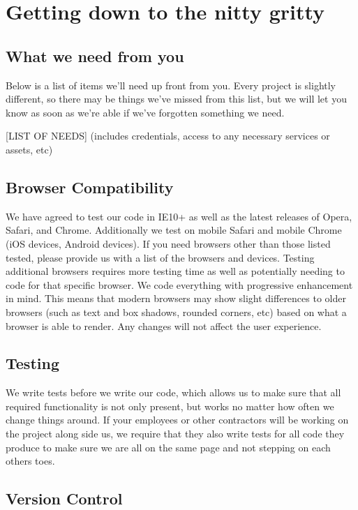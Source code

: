 \documentclass[10pt,a4paper,parskip]{scrartcl}
\begin{document}
\section{Getting down to the nitty gritty}

\subsection{What we need from you}

Below is a list of items we’ll need up front from you. Every project is
slightly different, so there may be things we’ve missed from this list, but we
will let you know as soon as we’re able if we’ve forgotten something we need.

[LIST OF NEEDS] (includes credentials, access to any necessary services or
assets, etc)

\subsection{Browser Compatibility}

We have agreed to test our code in IE10+ as well as the latest releases of
Opera, Safari, and Chrome. Additionally we test on mobile Safari and mobile
Chrome (iOS devices, Android devices). If you need browsers other than those
listed tested, please provide us with a list of the browsers and devices.
Testing additional browsers requires more testing time as well as potentially
needing to code for that specific browser.
We code everything with progressive enhancement in mind. This means that modern
browsers may show slight differences to older browsers (such as text and box
shadows, rounded corners, etc) based on what a browser is able to render. Any
changes will not affect the user experience.

\subsection{Testing}

We write tests before we write our code, which allows us to make sure that all
required functionality is not only present, but works no matter how often we
change things around. If your employees or other contractors will be working on
the project along side us, we require that they also write tests for all code
they produce to make sure we are all on the same page and not stepping on each
others toes.

\subsection{Version Control}
\end{document}
